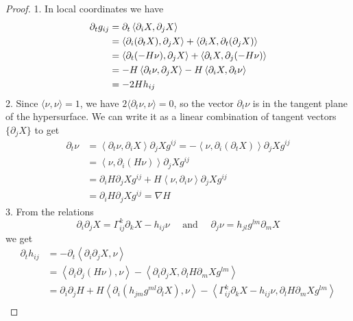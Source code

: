 \begin{proof}
1. In local coordinates we have 
\begin{align*}
    \partial_tg_{ij} & = \partial_{t} \left\langle \partial_{i}X, \partial_{j}X \right\rangle \\
& = \left\langle \partial_{i}(\partial_{t}X), \partial_{j}X \right\rangle + \left\langle \partial_{i}X, \partial_{t}(\partial_{j}X) \right\rangle\\
& = \left\langle \partial_{t}(-H \nu), \partial_{j}X \right\rangle + \left\langle \partial_{i}X, \partial_{j}(-H \nu)\right\rangle \\
& = -H \left\langle \partial_{t} \nu, \partial_{j}X\right\rangle  - H \left\langle \partial_{i}X, \partial_{t}\nu\right\rangle \\
& = -2Hh_{ij}
\end{align*}
2. Since $\langle \nu, \nu \rangle = 1$, we have $2\langle \partial_{t}\nu, \nu \rangle = 0$, so the vector $\partial_{t}\nu$ is in the tangent plane of the hypersurface. We can write it as a linear combination of tangent vectors $\{\partial_{j}X\}$ to get
\begin{align*}
\partial_{t}\nu &= \left\langle \partial_{t}\nu, \partial_{i}X \right\rangle \partial_{j}Xg^{ij} = - \left\langle \nu, \partial_{i}\left( \partial_{t}X \right) \right\rangle\partial_{j}X g^{ij} \\
& = \left\langle \nu, \partial_{i}\left( H \nu \right) \right\rangle \partial_{j}Xg^{ij}\\
& = \partial_{i}H \partial_{j}X g^{ij} + H \left\langle \nu, \partial_{i}\nu\right\rangle \partial_{j}Xg^{ij}\\
& = \partial_{i}H\partial_{j}Xg^{ij} = \nabla H
\end{align*}
3. From the relations \[
\partial_{i}\partial_{j}X = \Gamma^{k}_{ij}\partial_{k}X	-h_{ij}\nu \quad \text{ and } \quad\partial_{j}\nu = h_{jl}g^{lm}\partial_{m}X\] we get 
\begin{align*}
\partial_{t} h_{ij} & = - \partial_{t} \left\langle\partial_{i}\partial_{j}X ,\nu\right\rangle\\
& = \left\langle\partial_{i}\partial_{j}(H \nu), \nu \right\rangle - \left\langle \partial_{i}\partial_{j}X, \partial_{l}H \partial_{m}Xg^{lm}\right\rangle \\
& = \partial_{i}\partial_{j}H + H \left\langle \partial_{i}\left( h_{jm}g^{ml} \partial_{l}X \right), \nu \right\rangle -\left< \Gamma_{ij}^{k}\partial_{k}X-h_{ij}\nu,\partial_{l}H \partial_{m}Xg^{lm} \right>\\

\end{align*}
\end{proof}

